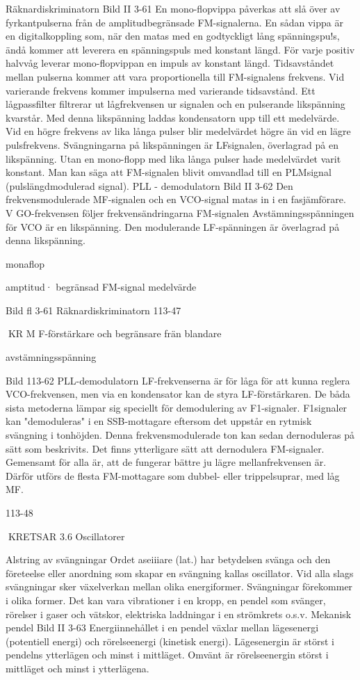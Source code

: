 \documentclass[a4paper,twoside,twocolumn,openright]{book}
\begin{document}
{{{{{{{Räknardiskriminatorn
Bild II 3-61
En mono-flopvippa påverkas att slå över av
fyrkantpulserna från de amplitudbegränsade
FM-signalerna.
En sådan vippa är en digitalkoppling som,
när den matas med en godtyckligt lång spänningspu!s, ändå kommer att leverera en spänningspuls med konstant längd. För varje
positiv halvvåg leverar mono-flopvippan en
impuls av konstant längd. Tidsavståndet
mellan pulserna kommer att vara proportionella till FM-signalens frekvens. Vid varierande frekvens kommer impulserna med
varierande tidsavstånd. Ett lågpassfilter filtrerar ut lågfrekvensen ur signalen och en
pulserande likspänning kvarstår. Med denna likspänning laddas kondensatorn upp till
ett medelvärde. Vid en högre frekvens av
lika långa pulser blir medelvärdet högre än
vid en lägre pulsfrekvens.
Svängningarna på likspänningen är LFsignalen, överlagrad på en likspänning. Utan
en mono-flopp med lika långa pulser hade
medelvärdet varit konstant. Man kan säga
att FM-signalen blivit omvandlad till en PLMsignal (pulslängdmodulerad signal).
PLL - demodulatorn
Bild II 3-62
Den frekvensmodulerade MF-signalen och
en VCO-signal matas in i en fasjämförare.
V GO-frekvensen följer frekvensändringarna
FM-signalen Avstämningsspänningen för
VCO är en likspänning. Den modulerande
LF-spänningen är överlagrad på denna likspänning.

monaflop

amptitud·
begränsad
FM-signal
medelvärde

Bild fl 3-61 Räknardiskriminatorn
113-47

KR
M F-förstärkare
och begränsare
frän blandare

avstämningsspänning

Bild 113-62 PLL-demodulatorn
LF-frekvenserna är för låga för att kunna
reglera VCO-frekvensen, men via en kondensator kan de styra LF-förstärkaren.
De båda sista metoderna lämpar sig speciellt för demodulering av F1-signaler. F1signaler kan "demoduleras" i en SSB-mottagare eftersom det uppstår en rytmisk svängning i tonhöjden. Denna frekvensmodulerade
ton kan sedan dernoduleras på sätt som
beskrivits.
Det finns ytterligare sätt att dernodulera
FM-signaler. Gemensamt för alla är, att de
fungerar bättre ju lägre mellanfrekvensen är.
Därför utförs de flesta FM-mottagare som
dubbel- eller trippelsuprar, med låg MF.

113-48

KRETSAR
3.6 Oscillatorer

Alstring av svängningar
Ordet aseiiiare (lat.) har betydelsen svänga
och den företeelse eller anordning som skapar en svängning kallas oscillator. Vid alla
slags svängningar sker växelverkan mellan
olika energiformer. Svängningar förekommer i olika former. Det kan vara vibrationer i
en kropp, en pendel som svänger, rörelser i
gaser och vätskor, elektriska laddningar i en
strömkrets o.s.v.
Mekanisk pendel
Bild II 3-63
Energiinnehållet i en pendel växlar mellan
lägesenergi (potentiell energi) och rörelseenergi (kinetisk energi). Lägesenergin är
störst i pendelns ytterlägen och minst i mittläget. Omvänt är rörelseenergin störst i mittläget och minst i ytterlägena.

}}}}}}}
\end{document}
